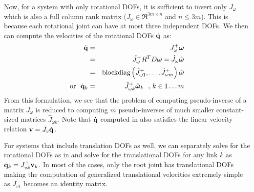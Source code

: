 Now, for a system with only rotational DOFs, it is sufficient to invert
only $J_{\omega}$ which is also a full column rank matrix
($J_{\omega} \in \Re^{3m \times n}$ and $n\leq 3m$). This
is because each rotational joint can have at most three independent
DOFs.  We then can compute the velocities of the rotational DOFs
$\dot{\mathbf{q}}$ as:
\begin{eqnarray}
\label{eq:angvel_cart2gen}
\nonumber
 \dot{\mathbf{q}} & = & J_{\omega}^+ \bm{\omega}\\
 \nonumber
 & = &  \hat{J}_{\omega}^+ R^T D\bm{\omega} = \hat{J}_{\omega} \hat{\bm{\omega}} \\
\nonumber
& = & \mbox{blockdiag}\left(\hat{J}_{\omega 1}^+,\hdots,\hat{J}_{\omega m}^+\right ) \hat{\bm{\omega}}\\
\mbox{or\ \ } \dot{\mathbf{q}}_k & = & \hat{J}_{\omega k}^+ \hat{\bm{\omega}}_k \mbox{\ \ , } k \in 1\hdots m
\end{eqnarray}
From this formulation, we see that the problem of computing pseudo-inverse of a matrix
$J_{\omega}$ is reduced to computing $m$ pseudo-inverses of much
smaller constant-sized matrices $\hat{J}_{\omega k}$. Note that $\dot{\mathbf{q}}$ computed in  also satisfies the linear velocity relation $\mathbf{v} = J_v \dot{\mathbf{q}}$.



For systems that include translation DOFs as well, we can separately solve for the rotational DOFs as in  and solve for the translational DOFs for any link $k$ as $\dot{\mathbf{q}}_k = J_{vk}^+\mathbf{v}_k$. In most of the cases, only the root joint has translational DOFs making the computation of generalized translational velocities extremely simple as $J_{v1}$ becomes an identity matrix.


